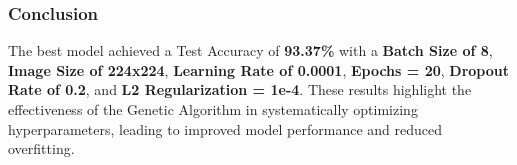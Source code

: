   
  
\subsubsection{Conclusion}
The best model achieved a Test Accuracy of \textbf{93.37\%} with a \textbf{Batch Size of 8}, \textbf{Image Size of 224x224}, \textbf{Learning Rate of 0.0001}, \textbf{Epochs = 20}, \textbf{Dropout Rate of 0.2}, and \textbf{L2 Regularization = 1e-4}. These results highlight the effectiveness of the Genetic Algorithm in systematically optimizing hyperparameters, leading to improved model performance and reduced overfitting.



